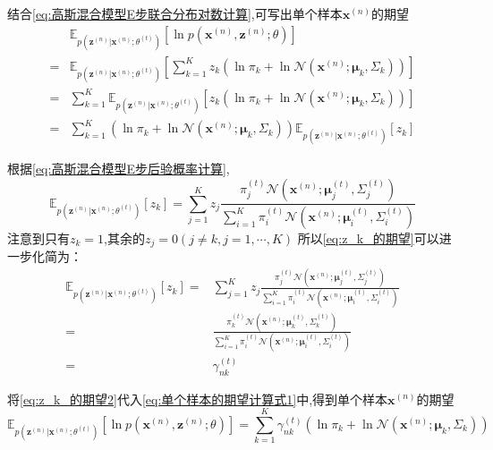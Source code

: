 \documentclass[withoutpreface,bwprint]{NoteBook}
\begin{document}
结合\cref{eq:高斯混合模型E步联合分布对数计算},可写出单个样本$ \mathbf{x}^{(n)} $的期望
\begin{align}
    \label{eq:单个样本的期望计算式1}
    & \mathbb{E}_{p(\mathbf{z}^{(n)}|\mathbf{x}^{(n)};\theta^{(t)})} \left[ \ln p(\mathbf{x}^{(n)},\mathbf{z}^{(n)};\theta)\right] \nonumber \\
    = &\mathbb{E}_{p(\mathbf{z}^{(n)}|\mathbf{x}^{(n)};\theta^{(t)})} \left[ \sum_{k=1}^{K} z_k \left( \ln \pi_k + \ln \mathcal{N}(\mathbf{x}^{(n)}; \bm{\mu}_k,\Sigma_k )\right) \right] \nonumber \\
    = & \sum_{k=1}^{K} \mathbb{E}_{p(\mathbf{z}^{(n)}|\mathbf{x}^{(n)};\theta^{(t)})} \left[ z_k \left(\ln \pi_k + \ln \mathcal{N}(\mathbf{x}^{(n)}; \bm{\mu}_k,\Sigma_k )\right) \right] \nonumber \\
    = & \sum_{k=1}^{K} \left(\ln \pi_k + \ln \mathcal{N}(\mathbf{x}^{(n)}; \bm{\mu}_k,\Sigma_k )\right) \mathbb{E}_{p(\mathbf{z}^{(n)}|\mathbf{x}^{(n)};\theta^{(t)})} \left[ z_k \right] 
\end{align}

根据\cref{eq:高斯混合模型E步后验概率计算},
\begin{equation}
    \label{eq:z_k_的期望}
    \mathbb{E}_{p(\mathbf{z}^{(n)}|\mathbf{x}^{(n)};\theta^{(t)})} \left[ z_k \right] 
    =\sum_{j=1}^{K} z_j \frac{\pi_j^{(t)} \mathcal{N}(\mathbf{x}^{(n)}; \bm{\mu}_j^{(t)},\Sigma_j^{(t)} )}{\sum_{i=1}^{K} \pi_i^{(t)} \mathcal{N}(\mathbf{x}^{(n)}; \bm{\mu}_i^{(t)},\Sigma_i^{(t)} )}
\end{equation}
注意到只有$z_k=1$,其余的$z_j=0 (j \neq k, j=1, \cdots, K)$
所以\cref{eq:z_k_的期望}可以进一步化简为：
\begin{align}
    \label{eq:z_k_的期望2}
    \mathbb{E}_{p(\mathbf{z}^{(n)}|\mathbf{x}^{(n)};\theta^{(t)})} \left[ z_k \right] 
    =& \sum_{j=1}^{K} z_j \frac{\pi_j^{(t)} \mathcal{N}(\mathbf{x}^{(n)}; \bm{\mu}_j^{(t)},\Sigma_j^{(t)} )}{\sum_{i=1}^{K} \pi_i^{(t)} \mathcal{N}(\mathbf{x}^{(n)}; \bm{\mu}_i^{(t)},\Sigma_i^{(t)} )} \nonumber \\
    =& \frac{\pi_k^{(t)} \mathcal{N}(\mathbf{x}^{(n)}; \bm{\mu}_k^{(t)},\Sigma_k^{(t)} )}{\sum_{i=1}^{K} \pi_i^{(t)} \mathcal{N}(\mathbf{x}^{(n)}; \bm{\mu}_i^{(t)},\Sigma_i^{(t)} )} \nonumber \\
    =& \gamma_{nk}^{(t)} 
\end{align}


将\cref{eq:z_k_的期望2}代入\cref{eq:单个样本的期望计算式1}中,得到单个样本$\mathbf{x}^{(n)}$的期望
\begin{equation}
    \label{eq:单个样本的期望计算式2}
    \mathbb{E}_{p(\mathbf{z}^{(n)}|\mathbf{x}^{(n)};\theta^{(t)})} \left[ \ln p(\mathbf{x}^{(n)},\mathbf{z}^{(n)};\theta)\right] 
    = \sum_{k=1}^{K} \gamma_{nk}^{(t)} \left(\ln \pi_k + \ln \mathcal{N}(\mathbf{x}^{(n)}; \bm{\mu}_k,\Sigma_k )\right)
\end{equation}
\end{document}
